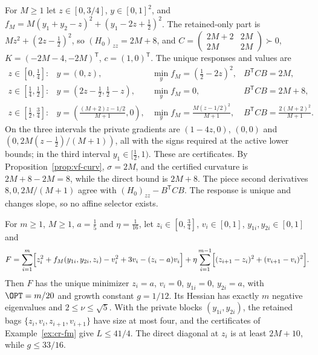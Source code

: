 \begin{example}\label{ex:cr-fm}
For $M\ge1$ let $z\in[0,3/4]$, $y\in[0,1]^2$, and
$f_M=M(y_1+y_2-z)^2+(y_1-2z+\frac12)^2$. The retained-only part is
$Mz^2+(2z-\frac12)^2$, so $(H_0)_{zz}=2M+8$, and
$C=\left(\begin{smallmatrix}2M+2&2M\\2M&2M\end{smallmatrix}\right)\succ0$,
$K=(-2M-4,-2M)^{\mathsf T}$, $c=(1,0)^{\mathsf T}$. The unique responses and
values are
\[
\begin{array}{llll}
z\in[0,\tfrac14]:& y=(0,z),& \min_yf_M=(\tfrac12-2z)^2,& B^{\mathsf T}CB=2M,\\
z\in[\tfrac14,\tfrac12]:& y=(2z-\tfrac12,\tfrac12-z),& \min_yf_M=0,& B^{\mathsf T}CB=2M+8,\\
z\in[\tfrac12,\tfrac34]:& y=(\tfrac{(M+2)z-1/2}{M+1},0),& \min_yf_M=\tfrac{M(z-1/2)^2}{M+1},
& B^{\mathsf T}CB=\tfrac{2(M+2)^2}{M+1}.
\end{array}
\]
On the three intervals the private gradients are $(1-4z,0)$, $(0,0)$ and
$(0,2M(z-\frac12)/(M+1))$, all with the signs required at the active lower
bounds; in the third interval $y_1\in[\frac12,1)$. These are certificates. By
Proposition~\ref{prop:vf-curv}, $\sigma=2M$, and the certified curvature is
$2M+8-2M=8$, while the direct bound is $2M+8$. The piece second derivatives
$8,0,2M/(M+1)$ agree with $(H_0)_{zz}-B^{\mathsf T}CB$. The response is unique
and changes slope, so no affine selector exists.
\end{example}

\begin{proposition}\label{prop:cr-ladder}
For $m\ge1$, $M\ge1$, $a=\frac15$ and $\eta=\frac1{16}$, let
$z_i\in[0,\frac34]$, $v_i\in[0,1]$, $y_{1i},y_{2i}\in[0,1]$ and
\[
F=\sum_{i=1}^m\Bigl[z_i^2+f_M(y_{1i},y_{2i},z_i)-v_i^2+3v_i-(z_i-a)v_i\Bigr]
+\eta\sum_{i=1}^{m-1}\Bigl[(z_{i+1}-z_i)^2+(v_{i+1}-v_i)^2\Bigr].
\]
Then $F$ has the unique minimizer $z_i=a$, $v_i=0$, $y_{1i}=0$, $y_{2i}=a$, with
$\OPT=m/20$ and growth constant $g=1/12$. Its Hessian has exactly $m$
negative eigenvalues and $2\le\nu\le\sqrt5$. With the private blocks
$(y_{1i},y_{2i})$, the retained bags $\{z_i,v_i,z_{i+1},v_{i+1}\}$ have size at
most four, and the certificates of Example~\ref{ex:cr-fm} give $L\le41/4$. The
direct diagonal at $z_i$ is at least $2M+10$, while $g\le33/16$.
\end{proposition}


